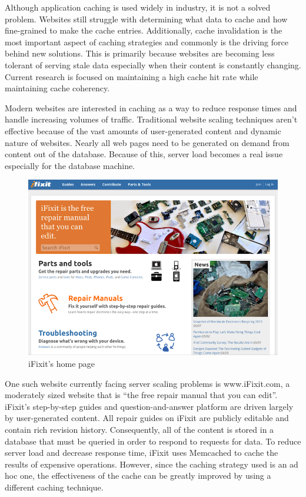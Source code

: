 \documentclass[12pt]{ucthesis}
\begin{document}
Although application caching is used widely in industry, it is not a solved problem.
Websites still struggle with determining what data to cache and how fine-grained to make the cache entries.
Additionally, cache invalidation is the most important aspect of caching strategies and commonly is the driving force behind new solutions.
This is primarily because websites are becoming less tolerant of serving stale data especially when their content is constantly changing.
Current research is focused on maintaining a high cache hit rate while maintaining cache coherency.

Modern websites are interested in caching as a way to reduce response times and handle increasing volumes of traffic.
Traditional website scaling techniques aren't effective because of the vast amounts of user-generated content and dynamic nature of websites.
Nearly all web pages need to be generated on demand from content out of the database.
Because of this, server load becomes a real issue especially for the database machine.

\begin{figure}[h]
\centering
\includegraphics[width=\textwidth]{assets/iFixitHomepage.png}
\caption{iFixit's home page}
\label{fig:iFixitHomePage}
\end{figure}

One such website currently facing server scaling problems is \textsf{www.iFixit.com}, a moderately sized website that is ``the free repair manual that you can edit''\cite{ifixitDotCom}.
\textsf{iFixit}'s step-by-step guides and question-and-answer platform are driven largely by user-generated content.
All repair guides on \textsf{iFixit} are publicly editable and contain rich revision history.
Consequently, all of the content is stored in a database that must be queried in order to respond to requests for data.
To reduce server load and decrease response time, \textsf{iFixit} uses \textsf{Memcached} to cache the results of expensive operations.
However, since the caching strategy used is an ad hoc one, the effectiveness of the cache can be greatly improved by using a different caching technique.
\end{document}
